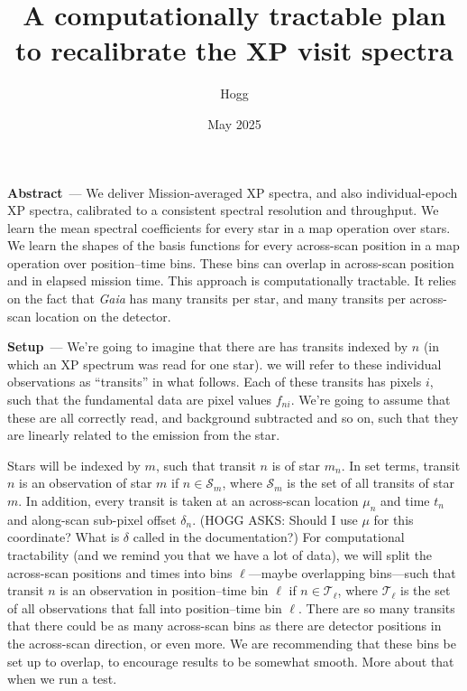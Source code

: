 \documentclass{article}
\title{\bfseries A computationally tractable plan to recalibrate the XP visit spectra}
\author{Hogg}
\date{May 2025}
\renewcommand{\paragraph}[1]{\bigskip\par\noindent\textbf{#1}~---}
\newcommand{\set}[1]{\mathscr{#1}}
\begin{document}
\maketitle

\paragraph{Abstract}
We deliver Mission-averaged XP spectra, and also individual-epoch XP spectra, calibrated to a consistent spectral resolution and throughput.
We learn the mean spectral coefficients for every star in a map operation over stars.
We learn the shapes of the basis functions for every across-scan position in a map operation over position--time bins.
These bins can overlap in across-scan position and in elapsed mission time.
This approach is computationally tractable.
It relies on the fact that \textsl{Gaia} has many transits per star, and many transits per across-scan location on the detector.

\paragraph{Setup}
We're going to imagine that there are has transits indexed by $n$ (in which an XP spectrum was read for one star).
we will refer to these individual observations as ``transits'' in what follows.
Each of these transits has pixels $i$, such that the fundamental data are pixel values $f_{ni}$.
We're going to assume that these are all correctly read, and background subtracted and so on, such that they are linearly related to the emission from the star.

Stars will be indexed by $m$, such that transit $n$ is of star $m_n$.
In set terms, transit $n$ is an observation of star $m$ if $n\in\set{S}_m$, where $\set{S}_m$ is the set of all transits of star $m$.
In addition, every transit is taken at an across-scan location $\mu_n$ and time $t_n$ and along-scan sub-pixel offset $\delta_n$.
(HOGG ASKS: Should I use $\mu$ for this coordinate? What is $\delta$ called in the documentation?)
For computational tractability (and we remind you that we have a lot of data), we will split the across-scan positions and times into bins $\ell$---maybe overlapping bins---such that transit $n$ is an observation in position--time bin $\ell$ if $n\in\set{T}_\ell$, where $\set{T}_\ell$ is the set of all observations that fall into position--time bin $\ell$.
There are so many transits that there could be as many across-scan bins as there are detector positions in the across-scan direction, or even more.
We are recommending that these bins be set up to overlap, to encourage results to be somewhat smooth.
More about that when we run a test.
\end{document}
